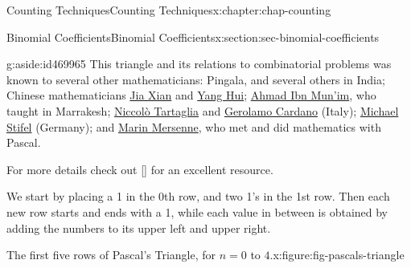 \documentclass[oneside,10pt,]{book}
\newcommand{\xreffont}{\relax}
\numberwithin{equation}{section}
\begin{document}
\begin{chapterptx}{Counting Techniques}{}{Counting Techniques}{}{}{x:chapter:chap-counting}
\begin{sectionptx}{Binomial Coefficients}{}{Binomial Coefficients}{}{}{x:section:sec-binomial-coefficients}
\begin{aside}{}{g:aside:id469965}
This triangle and its relations to combinatorial problems was known to several other mathematicians: Pingala, and several others in India; Chinese mathematicians \href{https://en.wikipedia.org/wiki/Jia_Xian}{Jia Xian} and \href{https://en.wikipedia.org/wiki/Yang_Hui}{Yang Hui}; \href{https://en.wikipedia.org/wiki/Ahmad_ibn_Munim_al-Abdari}{Ahmad Ibn Mun'im}, who taught in Marrakesh; \href{https://en.wikipedia.org/wiki/Niccol\%C3\%B2_Fontana_Tartaglia}{Niccolò Tartaglia} and \href{https://en.wikipedia.org/wiki/Gerolamo_Cardano}{Gerolamo Cardano} (Italy); \href{https://en.wikipedia.org/wiki/Michael_Stifel}{Michael Stifel} (Germany); and \href{https://en.wikipedia.org/wiki/Marin_Mersenne}{Marin Mersenne}, who met and did mathematics with Pascal.%
\par
For more details check out \hyperlink{x:biblio:bib-wilson-2013}{[{\xreffont 8}]} for an excellent resource.%
\end{aside}
We start by placing a 1 in the 0th row, and two 1's in the 1st row. Then each new row starts and ends with a 1, while each value in between is obtained by adding the numbers to its upper left and upper right.%
\begin{figureptx}{The first five rows of Pascal's Triangle, for \(n = 0\) to \(4\).}{x:figure:fig-pascals-triangle}{}%
\begin{image}{0.3}{0.4}{0.3}%
\end{image}
\end{figureptx}
\end{sectionptx}
\end{chapterptx}
\end{document}
